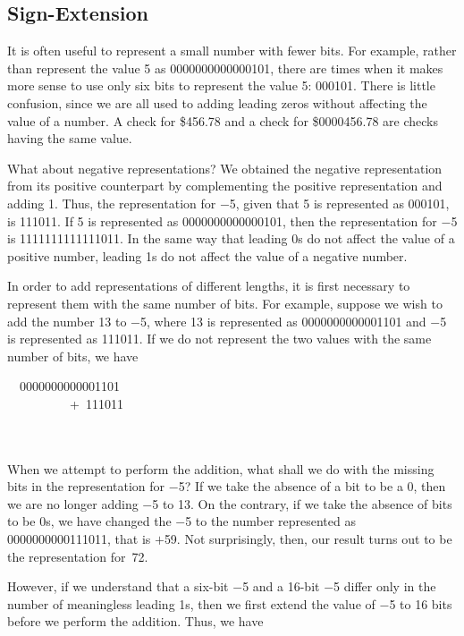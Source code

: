 \documentclass{patt}
\begin{document}
\subsection{Sign-Extension}

It is often useful to represent a small number with fewer bits.  For
example, rather than represent the value 5 as
0000000000000101, there are times when it\vadjust{\pagebreak} makes more sense
to use only six bits to represent the value 5: 000101.  There is little 
confusion, since we are all used to adding leading zeros without affecting the
value of a number.  A check for \$456.78 and a check for \$0000456.78
are checks having the same value.

What about negative representations?  We obtained the negative
representation from its positive counterpart by complementing the
positive representation and adding 1.  Thus, the representation  \lightbulb[-18pt]
for $-$5, given that 5 is represented as 000101, is 111011.
If 5 is represented as 0000000000000101, then the representation for
$-$5 is 1111111111111011.  In the same way that leading 0s do not
affect the value of a positive number, leading 1s do not affect the
value of a negative number.

In order to add representations of different lengths, it is first
necessary to represent them with the same number of bits.  For
example, suppose we wish to add the number 13 to $-$5, where 13 is
represented as 0000000000001101 and $-$5 is represented as 111011.  If
we do not represent the two values with the same number of bits, we
have

\begin{cctable}
~~0000000000001101\\
~~~~~~~~~~+~111011\\
\\[-17pt]\\[-2pt]
\end{cctable}

\noindent
When we attempt to perform the addition, what shall we do with the
missing bits in the representation for $-$5?  If we take the absence
of a bit to be a 0, then we are no longer adding $-$5 to 13.  On the
contrary, if we take the absence of bits to be 0s, we have changed the
$-$5 to the number represented as 0000000000111011, that is $+$59.
Not surprisingly, then, our result turns out to be the representation
for~72.

However, if we understand that a six-bit $-$5 and a 16-bit $-$5
differ only in the number of meaningless leading 1s, then we
first extend the value of $-$5 to 16 bits before we perform
the addition.  Thus, we have
\end{document}
